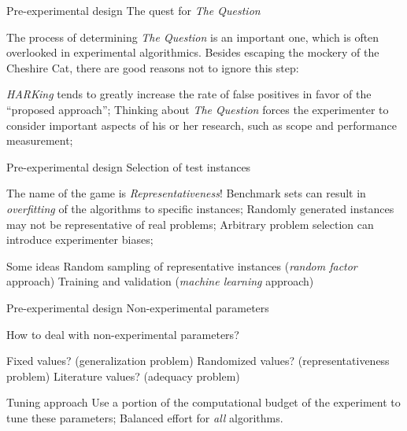 \documentclass[t]{beamer}
\begin{document}

\begin{ftst}
{Pre-experimental design}
{The quest for \textit{The Question}}
%
The process of determining \textit{The Question} is an important one, which is often overlooked in experimental algorithmics.
\vone
Besides escaping the mockery of the Cheshire Cat, there are good reasons not to ignore this step:

\bitems \textit{HARKing} tends to greatly increase the rate of false positives in favor of the ``proposed approach'';
\spitem Thinking about \textit{The Question} forces the experimenter to consider important aspects of his or her research, such as scope and performance measurement;
\eitem
{}
\end{ftst}


\begin{ftst}
{Pre-experimental design}
{Selection of test instances}
The name of the game is \textit{Representativeness}!
\vone
Benchmark sets can result in \textit{overfitting} of the algorithms to specific instances;
\vhalf
Randomly generated instances may not be representative of real problems;
\vhalf
Arbitrary problem selection can introduce experimenter biases;
\vone
\begin{block}{Some ideas}
\bitems Random sampling of representative instances (\textit{random factor} approach)
\spitem Training and validation (\textit{machine learning} approach)\eitem
\end{block}
\end{ftst}


\begin{ftst}
{Pre-experimental design}
{Non-experimental parameters}
How to deal with non-experimental parameters?

\bitems Fixed values? (generalization problem)
\spitem Randomized values? (representativeness problem) 
\spitem Literature values? (adequacy problem)
\eitem
\vhalf
\begin{block}{Tuning approach}
\bitems Use a portion of the computational budget of the experiment to tune these parameters;
\spitem Balanced effort for \textit{all} algorithms.
\eitem
\end{block}
\end{ftst}
\end{document}

